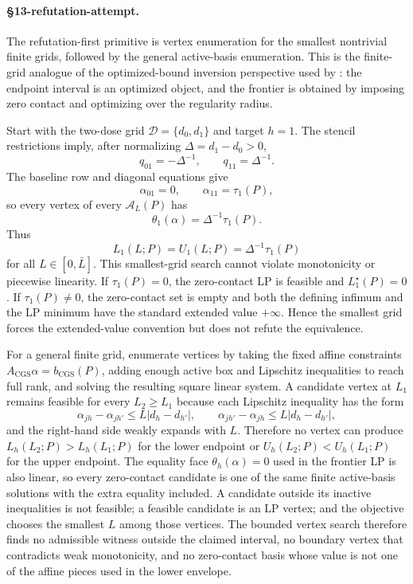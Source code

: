 \paragraph{\S13-refutation-attempt.}
The refutation-first primitive is vertex enumeration for the smallest
nontrivial finite grids, followed by the general active-basis enumeration.
This is the finite-grid analogue of the optimized-bound inversion perspective
used by \cite{ChernozhukovLeeRosen2013}: the endpoint interval is an optimized
object, and the frontier is obtained by imposing zero contact and optimizing
over the regularity radius.

Start with the two-dose grid \(\mathcal D=\{d_0,d_1\}\) and target \(h=1\).
The stencil restrictions imply, after normalizing
\(\Delta=d_1-d_0>0\),
\[
  q_{01}=-\Delta^{-1},\qquad q_{11}=\Delta^{-1}.
\]
The baseline row and diagonal equations give
\[
  \alpha_{01}=0,\qquad \alpha_{11}=\tau_1(P),
\]
so every vertex of every \(\mathcal A_L(P)\) has
\[
  \theta_1(\alpha)=\Delta^{-1}\tau_1(P).
\]
Thus
\[
  L_1(L;P)=U_1(L;P)=\Delta^{-1}\tau_1(P)
\]
for all \(L\in[0,\bar L]\).  This smallest-grid search cannot violate
monotonicity or piecewise linearity.  If \(\tau_1(P)=0\), the zero-contact LP
is feasible and \(L_1^\star(P)=0\).  If \(\tau_1(P)\ne0\), the zero-contact
set is empty and both the defining infimum and the LP minimum have the
standard extended value \(+\infty\).  Hence the smallest grid forces the
extended-value convention but does not refute the equivalence.

For a general finite grid, enumerate vertices by taking the fixed affine
constraints \(A_{\mathrm{CGS}}\alpha=b_{\mathrm{CGS}}(P)\), adding enough
active box and Lipschitz inequalities to reach full rank, and solving the
resulting square linear system.  A candidate vertex at \(L_1\) remains feasible
for every \(L_2\ge L_1\) because each Lipschitz inequality has the form
\[
  \alpha_{j h}-\alpha_{j h'}\le L|d_h-d_{h'}|,
  \qquad
  \alpha_{j h'}-\alpha_{j h}\le L|d_h-d_{h'}|,
\]
and the right-hand side weakly expands with \(L\).  Therefore no vertex can
produce \(L_h(L_2;P)>L_h(L_1;P)\) for the lower endpoint or
\(U_h(L_2;P)<U_h(L_1;P)\) for the upper endpoint.  The equality face
\(\theta_h(\alpha)=0\) used in the frontier LP is also linear, so every
zero-contact candidate is one of the same finite active-basis solutions with
the extra equality included.  A candidate outside its inactive inequalities is
not feasible; a feasible candidate is an LP vertex; and the objective chooses
the smallest \(L\) among those vertices.  The bounded vertex search therefore
finds no admissible witness outside the claimed interval, no boundary vertex
that contradicts weak monotonicity, and no zero-contact basis whose value is
not one of the affine pieces used in the lower envelope.


